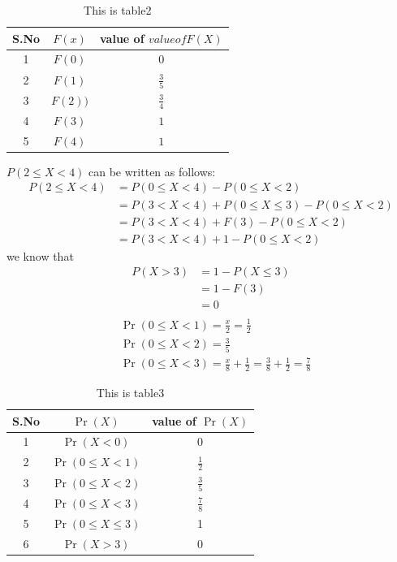 \documentclass[journal,12pt,twocolumn]{IEEEtran}
\begin{document}
\begin{table}[h!]
\resizebox{9.5cm}{!}
{ 
\begin{tabular}{|c|c|c|}
\hline
S.No & $F(x)$  & value of $value of F(X)$\\
\hline
1 & $F(0)$ & $0$ \\
\hline
2 & $F(1)$ & $\frac{3}{5}$ \\
\hline
3 &  $F(2))$ & $\frac{3}{4}$ \\
\hline
4 & $F(3)$ & $1$ \\
\hline
5 & $F(4)$ & $1$ \\
\hline
\end{tabular} 
}
\caption{This is table2}
\label{table:2}
\end{table}

$P(2 \leq X <4) $ can be written as follows:
\begin{align}
P(2 \leq X <4) &= P(0 \leq X < 4) - P(0 \leq X <2)\\
&= P(3<X<4) + P(0 \leq X \leq 3)  - P(0 \leq X <2) \\
&=  P(3<X<4) + F(3)  - P(0 \leq X <2) \\
&=  P(3<X<4) + 1  - P(0 \leq X <2) \label{2}
\end{align}
we know that 
\begin{align}
P(X>3)&=1-P(X \leq 3)\\
&=1-F(3)\\
&=0 \label{3} \\
\end{align}
\begin{align}
& \Pr(0 \leq X<1) = \frac{x}{2} = \frac{1}{2} \\
& \Pr(0 \leq X<2 ) = \frac{3}{5} \label{4} \\
& \Pr(0 \leq X< 3) = \frac{x}{8} + \frac{1}{2} = \frac{3}{8}+ \frac{1}{2} = 
\frac{7}{8}
\end{align}

\begin{table}[h!]
\resizebox{9.5cm}{!}
{ 
\begin{tabular}{|c|c|c|}
\hline
S.No & $\Pr(X)$  & value of $\Pr(X)$\\
\hline
1 & $\Pr(X<0)$ & 0 \\
\hline
2 & $\Pr(0 \leq X<1)$ & $\frac{1}{2}$ \\
\hline
3 & $\Pr(0 \leq X<2 )$ & $\frac{3}{5}$ \\
\hline
4 &  $\Pr(0 \leq X< 3)$ & $\frac{7}{8}$ \\
\hline
5 & $\Pr(0 \leq X \leq 3)$ & 1 \\
\hline
6 & $\Pr(X>3)$ & 0 \\
\hline
\end{tabular} 
}
\caption{This is table3}
\label{table:3}
\end{table}
\end{document}
